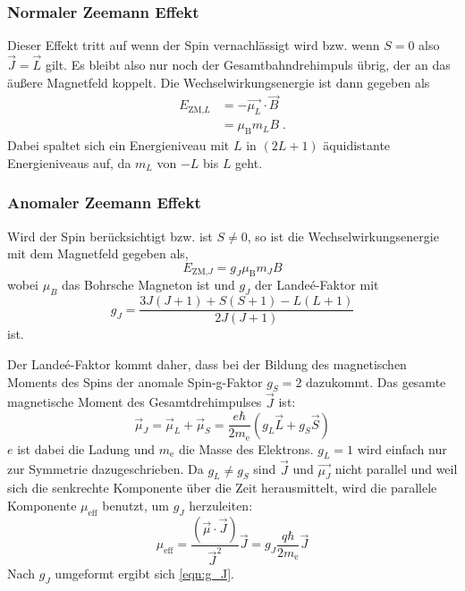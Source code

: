         \subsubsection*{Normaler Zeemann Effekt}
        \label{sec:normalerZeemann}
            Dieser Effekt tritt auf wenn der Spin vernachlässigt wird bzw. wenn $S=0$ also $\vec{J} = \vec{L}$ gilt.
            Es bleibt also nur noch der Gesamtbahndrehimpuls übrig, der an das äußere Magnetfeld koppelt.
            Die Wechselwirkungsenergie ist dann gegeben als
            \begin{align}
                E_{\text{ZM,}L} &= - \vec{\mu_L} \cdot \vec{B} \nonumber \\
                                &= \mu_{\text{B}} m_L B \;.
            \end{align}
            Dabei spaltet sich ein Energieniveau mit $L$ in $(2L+1)$ äquidistante Energieniveaus auf, da $m_L$ von $-L$ bis $L$ geht.

        \subsubsection*{Anomaler Zeemann Effekt}
        \label{sec:anomalerZeemann}
            Wird der Spin berücksichtigt bzw. ist $S \neq 0$, so ist die Wechselwirkungsenergie mit dem Magnetfeld gegeben als,
            \begin{equation}
                E_{\text{ZM,}J} = g_J \mu_{\text{B}} m_J B
                \label{eqn:zeeman_energy}
            \end{equation}
            wobei $\mu_B$ das Bohrsche Magneton ist und $g_J$ der Landeé-Faktor mit
            \begin{equation}
                g_J = \frac{3J(J+1) + S(S+1) - L(L+1)}{2J(J+1)}
                \label{eqn:g_J}
            \end{equation}
            ist.
            
            Der Landeé-Faktor kommt daher, dass bei der Bildung des magnetischen Moments des Spins der anomale Spin-g-Faktor $g_S = 2$ dazukommt.
            Das gesamte magnetische Moment des Gesamtdrehimpulses $\vec{J}$ ist:
            \begin{equation}
                \vec{\mu}_J = \vec{\mu}_L + \vec{\mu}_S = \frac{e \hbar}{2m_{\text{e}}} \left(g_L \vec{L} + g_S \vec{S}\right)
            \end{equation}
            $e$ ist dabei die Ladung und $m_\text{e}$ die Masse des Elektrons. $g_L = 1$ wird einfach nur zur Symmetrie dazugeschrieben.
            Da $g_L \neq g_S$ sind $\vec{J}$ und $\vec{\mu_J}$ nicht parallel und weil sich die senkrechte Komponente über die Zeit herausmittelt, wird die parallele Komponente $\mu_{\text{eff}}$ benutzt, um $g_J$ herzuleiten:
            \begin{equation}
                \mu_{\text{eff}} = \frac{(\vec{\mu} \cdot \vec{J})}{\vec{J}^2} \vec{J} = g_J \frac{q \hbar}{2m_{\text{e}}} \vec{J}
            \end{equation}
            Nach $g_J$ umgeformt ergibt sich \eqref{eqn:g_J}.


